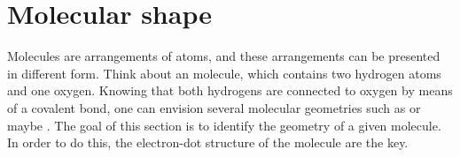 \documentclass[main.tex]{subfiles}
\begin{document}
\section{Molecular shape}
Molecules are arrangements of atoms, and these arrangements can be presented in different form. Think about an  molecule, which contains two hydrogen atoms and one oxygen. Knowing that both hydrogens are connected to oxygen by means of a covalent bond, one can envision several molecular geometries such as \hspace{.05in} \hspace{.05in} or maybe \hspace{.05in}\hspace{.05in}. The goal of this section is to identify the geometry of a given molecule. In order to do this, the electron-dot structure of the molecule are the key.
\sloppy 
\end{document}
